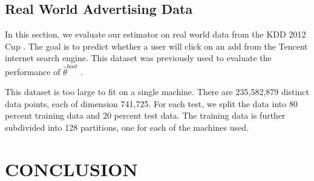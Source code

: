 \documentclass[twoside]{article}
\newcommand{\w}{\theta}
\newcommand{\wboot}{\hat\w^{boot}}
\begin{document}
\subsection{Real World Advertising Data}

In this section,
we evaluate our estimator on real world data from the KDD 2012 Cup \citep{kddcup2012}.
The goal is to predict whether a user will click on an add from the Tencent internet search engine.
This dataset was previously used to evaluate the performance of $\wboot$ \citep{zhang2012communication}.

This dataset is too large to fit on a single machine.
There are 235,582,879 distinct data points,
each of dimension 741,725.
For each test, we split the data into 80 percent training data and 20 percent test data.
The training data is further subdivided into 128 partitions,
one for each of the machines used.

\section{CONCLUSION}


\clearpage



\end{document}
